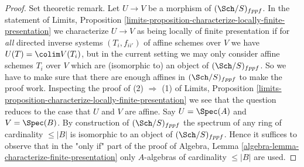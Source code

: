 \begin{proof}
\medskip\noindent
Set theoretic remark. Let $U \to V$ be a morphism of
$(\Sch/S)_{fppf}$. In the statement of
Limits, Proposition
\ref{limits-proposition-characterize-locally-finite-presentation}
we characterize $U \to V$ as being locally of finite presentation
if for {\it all} directed inverse systems $(T_i, f_{ii'})$ of affine schemes
over $V$ we have $U(T) = \colim V(T_i)$, but in the current setting
we may only consider affine schemes $T_i$ over $V$ which are (isomorphic to)
an object of $(\Sch/S)_{fppf}$. So we have to make sure that there
are enough affines in $(\Sch/S)_{fppf}$ to make the proof work.
Inspecting the proof of (2) $\Rightarrow$ (1) of
Limits, Proposition
\ref{limits-proposition-characterize-locally-finite-presentation}
we see that the question reduces to the case that $U$ and $V$ are affine.
Say $U = \Spec(A)$ and $V = \Spec(B)$. By construction
of $(\Sch/S)_{fppf}$ the spectrum of any ring of cardinality
$\leq |B|$ is isomorphic to an object of $(\Sch/S)_{fppf}$.
Hence it suffices to observe that in the "only if" part of the proof of
Algebra, Lemma \ref{algebra-lemma-characterize-finite-presentation}
only $A$-algebras of cardinality $\leq |B|$ are used.
\end{proof}
